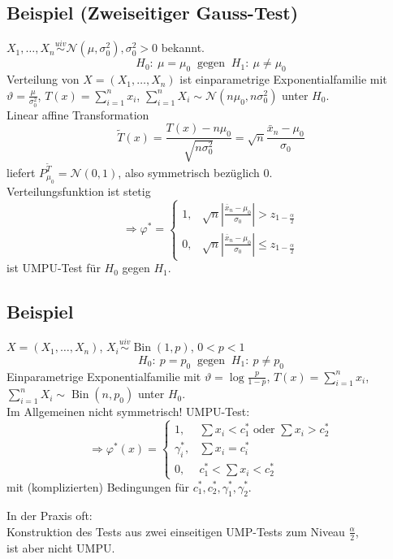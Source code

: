 \documentclass[a4paper,11pt,twoside,titlepage]{article}
\newcommand\NN{ \mathcal{N} } %
\newcommand{\uiv}{\ensuremath{\stackrel{uiv}{\sim}}}
\DeclareMathOperator{\Bin}{Bin}
\begin{document}
\subsection{Beispiel (Zweiseitiger Gauss-Test)}
$X_1,\ldots,X_n\uiv \NN(\mu,\sigma_0^2),\sigma_0^2>0$ bekannt.
\[H_0:\ \mu=\mu_0\ \mbox{ gegen }\ H_1:\ \mu\neq\mu_0\]
Verteilung von $X=(X_1,\ldots,X_n)$ ist einparametrige Exponentialfamilie mit $\vartheta=\frac{\mu}{\sigma_0^2}$, $T(x)=\sum_{i=1}^n x_i$, $\sum_{i=1}^n X_i\sim\NN(n\mu_0,n\sigma_0^2)$ unter $H_0$.\\
Linear affine Transformation
\[\tilde T(x)=\frac{T(x)-n\mu_0}{\sqrt{n\sigma_0^2}}=\sqrt{n}\frac{\bar x_n-\mu_0}{\sigma_0}\]
liefert $P_{\mu_0}^{\tilde T}=\NN(0,1)$, also symmetrisch bezüglich 0.\\
Verteilungsfunktion ist stetig
\[\Rightarrow \varphi^\ast=\left\{\begin{array}{cl}1,&\sqrt{n}|\frac{\bar x_n-\mu_0}{\sigma_0}|>z_{1-\frac\alpha2}\\0,&\sqrt{n}|\frac{\bar x_n-\mu_0}{\sigma_0}|\leq z_{1-\frac\alpha2}\end{array}\right.\]
ist UMPU-Test für $H_0$ gegen $H_1$.

\subsection{Beispiel}
$X=(X_1,\ldots,X_n)$, $X_i\uiv\Bin(1,p)$, $0<p<1$
\[H_0:\ p=p_0\ \mbox{ gegen }\ H_1:\ p\neq p_0\]
Einparametrige Exponentialfamilie mit $\vartheta=\log\frac{p}{1-p}$, $T(x)=\sum_{i=1}^n x_i$,\\ $\sum_{i=1}^n X_i\sim\Bin(n,p_0)$ unter $H_0$.\\
Im Allgemeinen nicht symmetrisch! UMPU-Test:
\[\Rightarrow \varphi^\ast(x)=\left\{\begin{array}{cl}1,&\sum x_i<c_1^\ast\mbox{ oder }\sum x_i>c_2^\ast\\\gamma_i^\ast,&\sum x_i =c_i^\ast\\0,&c_1^\ast<\sum x_i<c_2^\ast\end{array}\right.\]
mit (komplizierten) Bedingungen für $c_1^\ast,c_2^\ast,\gamma_1^\ast,\gamma_2^\ast$.

In der Praxis oft:\\
Konstruktion des Tests aus zwei einseitigen UMP-Tests zum Niveau $\frac\alpha2$,\\ ist aber nicht UMPU.

\vspace{1cm}
\end{document}
